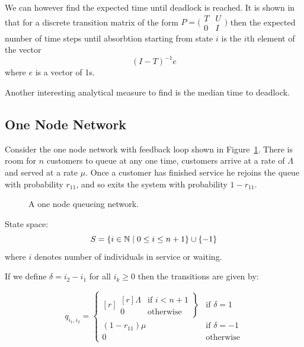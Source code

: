 \documentclass{article}
\begin{document}
We can however find the expected time until deadlock is reached.
It is shown in \cite{stewart09} that for a discrete transition matrix of the form $P = \bigl(\begin{smallmatrix} T & U\\ 0 & I \end{smallmatrix} \bigr)$ then the expected number of time steps until absorbtion starting from state $i$ is the $i\text{th}$ element of the vector
\begin{equation}
  (I - T)^{-1}e
\end{equation}
where $e$ is a vector of 1s.

Another interesting analytical measure to find is the median time to deadlock.

\subsection{One Node Network}\label{sec:1nodenet}
Consider the one node network with feedback loop shown in Figure~\ref{fig:queueingnetwork_1node}.
There is room for $n$ customers to queue at any one time, customers arrive at a rate of $\Lambda$ and served at a rate $\mu$.
Once a customer has finished service he rejoins the queue with probability $r_{11}$, and so exits the system with probability $1 - r_{11}$.

\begin{figure}[H]
  
  \caption{A one node queueing network.}
  \label{fig:queueingnetwork_1node}
\end{figure}

State space:
        \[S = \{i\in\mathbb{N} \nonscript\; | \nonscript\; 0 \leq i \leq n + 1
        \}\cup\{-1\}\]
where \(i\) denotes number of individuals in service or waiting.

If we define $\delta = i_2 - i_1$ for all $i_k \geq 0$ then the transitions are given by:

\begin{equation}
  q_{i_1, i_2} = \left\{
  \begin{matrix*}[ r ]
    \left. \begin{matrix*}[ r ]
      \Lambda & \text{if } i < n + 1 \\
      0 & \text{otherwise}
    \end{matrix*} \right\} & \text{if } \delta = 1 \\
    (1 - r_{11})\mu & \text{if } \delta = -1 \\
    0 & \text{otherwise}
  \end{matrix*} \right.
\end{equation}
\end{document}
